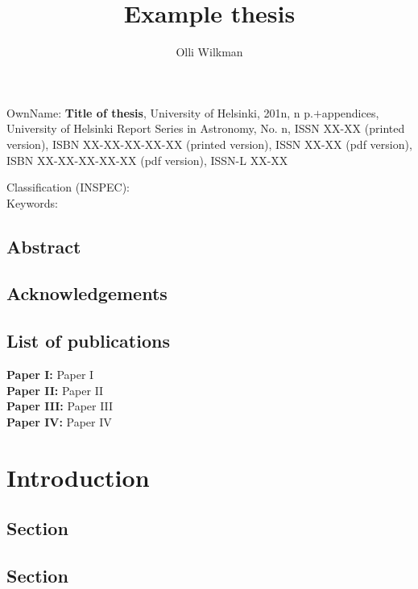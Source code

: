 \documentclass[a4paper,11pt,english]{report}
\title{Example thesis}
\author{Olli Wilkman}
\begin{document}
\maketitle




\setcounter{page}{1} 
\small
\noindent OwnName: \textbf{Title of thesis}, University of Helsinki, 201n, n
p.$+$appendices, University of Helsinki Report Series in Astronomy, No. n,
ISSN XX-XX (printed version), ISBN XX-XX-XX-XX-XX (printed version),
ISSN XX-XX (pdf version), ISBN XX-XX-XX-XX-XX (pdf version),
ISSN-L XX-XX

\vspace{0.3cm}
\noindent Classification (INSPEC): \\
\noindent Keywords: 

\normalsize
\section*{Abstract}

\newpage
{}
\section*{Acknowledgements}

\newpage
\section*{List of publications}

\textbf{Paper I:} Paper I \\
\newline
\textbf{Paper II:} Paper II \\
\newline
\textbf{Paper III:} Paper III \\
\newline
\textbf{Paper IV:} Paper IV


\pagestyle{headings}
\tableofcontents

\chapter{Introduction}

\section{Section}
\setcounter{page}{1} 

\section{Section}
\end{document}
